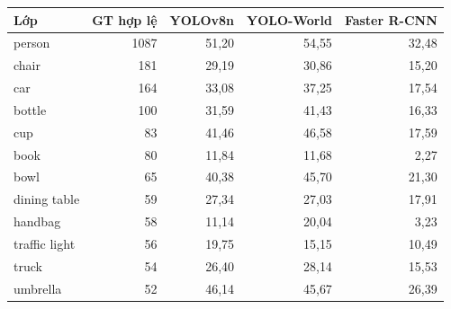 \begin{tabular}{lrrrr}
\toprule
Lớp & GT hợp lệ & YOLOv8n & YOLO-World & Faster R-CNN \\
\midrule
person & 1087 & 51{,}20 & 54{,}55 & 32{,}48 \\
chair & 181 & 29{,}19 & 30{,}86 & 15{,}20 \\
car & 164 & 33{,}08 & 37{,}25 & 17{,}54 \\
bottle & 100 & 31{,}59 & 41{,}43 & 16{,}33 \\
cup & 83 & 41{,}46 & 46{,}58 & 17{,}59 \\
book & 80 & 11{,}84 & 11{,}68 & 2{,}27 \\
bowl & 65 & 40{,}38 & 45{,}70 & 21{,}30 \\
dining table & 59 & 27{,}34 & 27{,}03 & 17{,}91 \\
handbag & 58 & 11{,}14 & 20{,}04 & 3{,}23 \\
traffic light & 56 & 19{,}75 & 15{,}15 & 10{,}49 \\
truck & 54 & 26{,}40 & 28{,}14 & 15{,}53 \\
umbrella & 52 & 46{,}14 & 45{,}67 & 26{,}39 \\
\bottomrule
\end{tabular}
